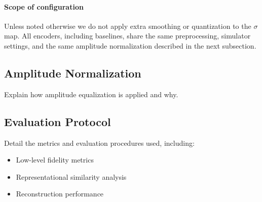 \paragraph{Scope of configuration}
Unless noted otherwise we do not apply extra smoothing or quantization to the \(\sigma\) map. All encoders, including baselines, share the same preprocessing, simulator settings, and the same amplitude normalization described in the next subsection.


\subsection{Amplitude Normalization}
Explain how amplitude equalization is applied and why.

\subsection{Evaluation Protocol}
Detail the metrics and evaluation procedures used, including:
\begin{itemize}
    \item Low-level fidelity metrics
    \item Representational similarity analysis
    \item Reconstruction performance
\end{itemize}
